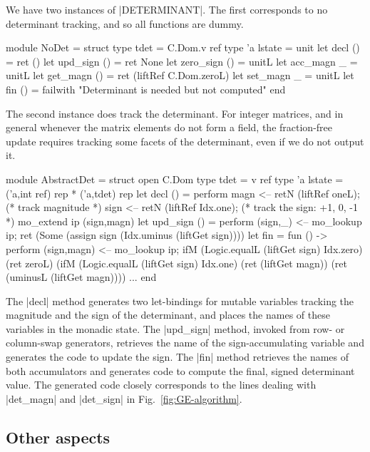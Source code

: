 \documentclass{elsart}
\begin{document}
We have two instances of |DETERMINANT|. The first corresponds to
no determinant tracking, and so all functions are dummy.
\begin{code}
module NoDet = struct
  type tdet = C.Dom.v ref
  type 'a lstate = unit
  let decl ()      = ret ()
  let upd_sign ()  = ret None
  let zero_sign () = unitL
  let acc_magn _   = unitL
  let get_magn ()  = ret (liftRef C.Dom.zeroL)
  let set_magn _   = unitL
  let fin () = failwith "Determinant is needed but not computed"
end
\end{code}


The second instance does track the determinant. For integer matrices,
and in general whenever the matrix elements do not form a field, 
the fraction-free update requires tracking some facets of the
determinant, even if we do not output it.
\begin{code}
module AbstractDet = struct
  open C.Dom
  type tdet = v ref
  type 'a lstate = ('a,int ref) rep * ('a,tdet) rep
  let decl () = perform
      magn <-- retN (liftRef oneL);    (* track magnitude *)
      sign <-- retN (liftRef Idx.one); (* track the sign: +1, 0, -1 *)
      mo_extend ip (sign,magn)
  let upd_sign () = perform
      (sign,_) <-- mo_lookup ip;
      ret (Some (assign sign (Idx.uminus (liftGet sign))))
  let fin = fun () -> perform
      (sign,magn) <-- mo_lookup ip;
      ifM (Logic.equalL (liftGet sign) Idx.zero) (ret zeroL)
      (ifM (Logic.equalL (liftGet sign) Idx.one) (ret (liftGet magn))
          (ret (uminusL (liftGet magn))))
  ...
end
\end{code}
The |decl| method generates two let-bindings for mutable variables
tracking the magnitude and the sign of the determinant, and places the
names of these variables in the monadic state. The |upd_sign| method,
invoked from row- or column-swap generators, retrieves the name of the
sign-accumulating variable and generates the code to update the
sign. The |fin| method retrieves the names of both accumulators and
generates code to compute the final, signed determinant value.  The
generated code closely corresponds to the lines dealing with
|det_magn| and |det_sign| in Fig.~\ref{fig:GE-algorithm}.


\subsection{Other aspects}
\end{document}
